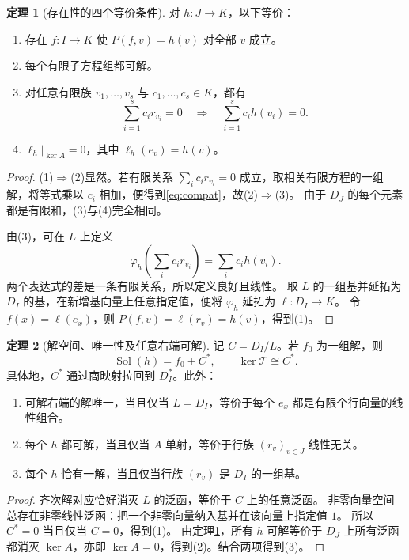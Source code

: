 \documentclass[UTF8,11pt,a4paper]{ctexart}
\theoremstyle{definition}
\newtheorem{theorem}{定理}[section]
\newcommand{\T}{\mathcal T}
\newcommand{\Sol}{\operatorname{Sol}}
\begin{document}
\begin{theorem}[存在性的四个等价条件]\label{thm:scalar}
对 $h:J\to K$，以下等价：
\begin{enumerate}
\item 存在 $f:I\to K$ 使 $P(f,v)=h(v)$ 对全部 $v$ 成立。
\item 每个有限子方程组都可解。
\item 对任意有限族 $v_1,\ldots,v_s$ 与 $c_1,\ldots,c_s\in K$，都有
\begin{equation}\label{eq:compat}
 \sum_{i=1}^s c_ir_{v_i}=0
 \quad\Longrightarrow\quad
 \sum_{i=1}^s c_ih(v_i)=0.
\end{equation}
\item $\ell_h|_{\ker A}=0$，其中 $\ell_h(e_v)=h(v)$。
\end{enumerate}
\end{theorem}
\begin{proof}
(1)$\Rightarrow$(2)显然。若有限关系 $\sum_i c_ir_{v_i}=0$ 成立，取相关有限方程的一组解，将等式乘以 $c_i$ 相加，便得到\eqref{eq:compat}，故(2)$\Rightarrow$(3)。
由于 $D_J$ 的每个元素都是有限和，(3)与(4)完全相同。

由(3)，可在 $L$ 上定义
\[
 \varphi_h\!\left(\sum_i c_ir_{v_i}\right)=\sum_i c_ih(v_i).
\]
两个表达式的差是一条有限关系，所以定义良好且线性。
取 $L$ 的一组基并延拓为 $D_I$ 的基，在新增基向量上任意指定值，便将 $\varphi_h$ 延拓为 $\ell:D_I\to K$。
令 $f(x)=\ell(e_x)$，则 $P(f,v)=\ell(r_v)=h(v)$，得到(1)。
\end{proof}

\begin{theorem}[解空间、唯一性及任意右端可解]\label{thm:scalarstructure}
记 $C=D_I/L$。若 $f_0$ 为一组解，则
\begin{equation}\label{eq:scalarstructure}
 \Sol(h)=f_0+C^*,\qquad \ker\T\cong C^*.
\end{equation}
具体地，$C^*$ 通过商映射拉回到 $D_I^*$。此外：
\begin{enumerate}
\item 可解右端的解唯一，当且仅当 $L=D_I$，等价于每个 $e_x$ 都是有限个行向量的线性组合。
\item 每个 $h$ 都可解，当且仅当 $A$ 单射，等价于行族 $(r_v)_{v\in J}$ 线性无关。
\item 每个 $h$ 恰有一解，当且仅当行族 $(r_v)$ 是 $D_I$ 的一组基。
\end{enumerate}
\end{theorem}
\begin{proof}
齐次解对应恰好消灭 $L$ 的泛函，等价于 $C$ 上的任意泛函。
非零向量空间总存在非零线性泛函：把一个非零向量纳入基并在该向量上指定值 $1$。
所以 $C^*=0$ 当且仅当 $C=0$，得到(1)。
由定理\ref{thm:scalar}，所有 $h$ 可解等价于 $D_J$ 上所有泛函都消灭 $\ker A$，亦即 $\ker A=0$，得到(2)。结合两项得到(3)。
\end{proof}
\end{document}
